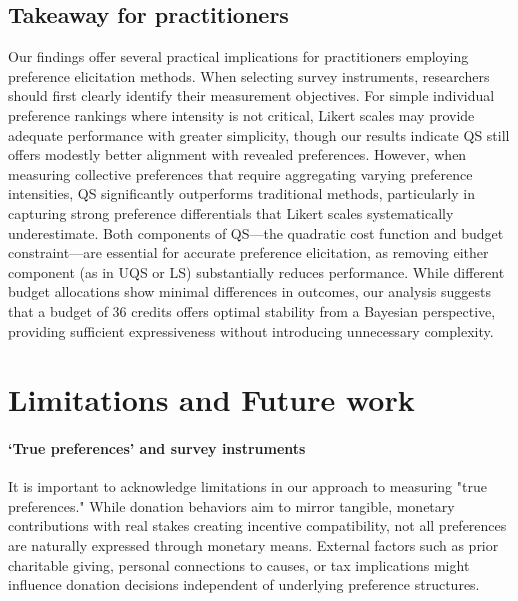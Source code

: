 \subsection{Takeaway for practitioners}
Our findings offer several practical implications for practitioners employing preference elicitation methods. When selecting survey instruments, researchers should first clearly identify their measurement objectives. For simple individual preference rankings where intensity is not critical, Likert scales may provide adequate performance with greater simplicity, though our results indicate QS still offers modestly better alignment with revealed preferences. However, when measuring collective preferences that require aggregating varying preference intensities, QS significantly outperforms traditional methods, particularly in capturing strong preference differentials that Likert scales systematically underestimate. Both components of QS—the quadratic cost function and budget constraint—are essential for accurate preference elicitation, as removing either component (as in UQS or LS) substantially reduces performance. While different budget allocations show minimal differences in outcomes, our analysis suggests that a budget of 36 credits offers optimal stability from a Bayesian perspective, providing sufficient expressiveness without introducing unnecessary complexity.

\section{Limitations and Future work}
\label{sec:limitations}

\paragraph{`True preferences' and survey instruments}
It is important to acknowledge limitations in our approach to measuring "true preferences." While donation behaviors aim to mirror tangible, monetary contributions with real stakes creating incentive compatibility, not all preferences are naturally expressed through monetary means. External factors such as prior charitable giving, personal connections to causes, or tax implications might influence donation decisions independent of underlying preference structures.




